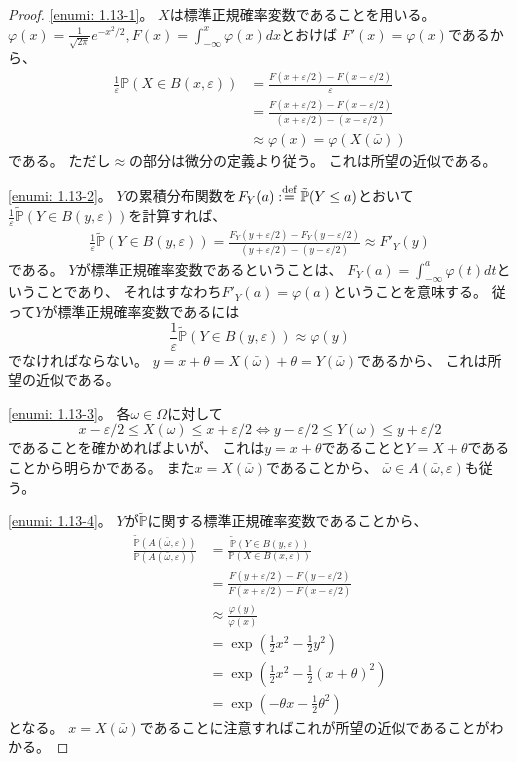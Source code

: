\documentclass[uplatex]{jsarticle}
\theoremstyle{definition}
\def\ep{\varepsilon}
\def\P{\mathbb{P}}
\def\dfn{:\overset{\mbox{{\scriptsize def}}}{=}}
\begin{document}
\begin{proof}
  \ref{enumi: 1.13-1}。
  \(X\)は標準正規確率変数であることを用いる。
  \(\varphi(x) = \frac{1}{\sqrt{2\pi}}e^{-x^2/2},
  F(x) = \int_{-\infty}^x \varphi(x)dx\)とおけば
  \(F'(x) = \varphi(x)\)であるから、
  \begin{align*}
    \frac{1}{\ep}\P(X\in B(x,\ep))
    &= \frac{F(x+\ep/2) - F(x-\ep/2)}{\ep} \\
    &= \frac{F(x+\ep/2) - F(x-\ep/2)}{(x+\ep/2) - (x-\ep/2)} \\
    &\approx \varphi(x) = \varphi(X(\bar{\omega}))
  \end{align*}
  である。
  ただし\(\approx\)の部分は微分の定義より従う。
  これは所望の近似である。

  \ref{enumi: 1.13-2}。
  \(Y\)の累積分布関数を\(F_Y(a) \dfn \tilde{\P}(Y\leq a)\)とおいて
  \(\frac{1}{\ep}\tilde{\P}(Y\in B(y,\ep))\)を計算すれば、
  \begin{align*}
    \frac{1}{\ep}\tilde{\P}(Y\in B(y,\ep))
    = \frac{F_Y(y+\ep/2) - F_Y(y-\ep/2)}{(y+\ep/2) - (y-\ep/2)}
    \approx F'_Y(y)
  \end{align*}
  である。
  \(Y\)が標準正規確率変数であるということは、
  \(F_Y(a) = \int_{-\infty}^a \varphi(t)dt\)ということであり、
  それはすなわち\(F'_Y(a) = \varphi(a)\)ということを意味する。
  従って\(Y\)が標準正規確率変数であるには
  \[
  \frac{1}{\ep}\tilde{\P}(Y\in B(y,\ep)) \approx
  \varphi(y)
  \]
  でなければならない。
  \(y = x + \theta = X(\bar{\omega}) + \theta = Y(\bar{\omega})\)であるから、
  これは所望の近似である。

  \ref{enumi: 1.13-3}。
  各\(\omega\in \Omega\)に対して
  \[
  x-\ep/2 \leq X(\omega) \leq x+\ep/2 \iff
  y-\ep/2 \leq Y(\omega) \leq y+\ep/2
  \]
  であることを確かめればよいが、
  これは\(y=x+\theta\)であることと\(Y=X+\theta\)であることから明らかである。
  また\(x = X(\bar{\omega})\)であることから、
  \(\bar{\omega}\in A(\bar{\omega},\ep)\)も従う。

  \ref{enumi: 1.13-4}。
  \(Y\)が\(\tilde{\P}\)に関する標準正規確率変数であることから、
  \begin{align*}
    \frac{\tilde{\P}(A(\bar{\omega},\ep))}{\P(A(\bar{\omega},\ep))}
    &= \frac{\tilde{\P}(Y\in B(y,\ep))}{\P(X\in B(x,\ep))} \\
    &= \frac{F(y+\ep/2) - F(y-\ep/2)}{F(x+\ep/2)-F(x-\ep/2)} \\
    &\approx \frac{\varphi(y)}{\varphi(x)} \\
    &= \exp(\frac{1}{2}x^2-\frac{1}{2}y^2) \\
    &= \exp(\frac{1}{2}x^2-\frac{1}{2}(x+\theta)^2) \\
    &= \exp(-\theta x - \frac{1}{2}\theta^2)
  \end{align*}
  となる。
  \(x = X(\bar{\omega})\)であることに注意すればこれが所望の近似であることがわかる。
\end{proof}
\end{document}
